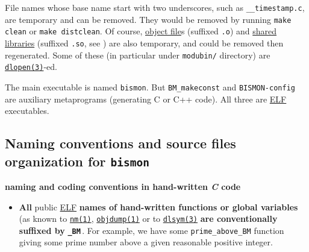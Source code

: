 \begin{appendices}
File names whose base name start with two underscores, such as
\texttt{\_\_timestamp.c}, are temporary and can be removed. They would
be removed by running \texttt{make clean} or \texttt{make
  distclean}.
 Of course,
\href{https://en.wikipedia.org/wiki/Object_file}{object file}s
(suffixed \texttt{.o}) and
\href{https://en.wikipedia.org/wiki/Library_(computing)#Shared_libraries}{shared
  libraries} (suffixed \texttt{.so}, see
\cite{Drepper:2011:sharedlib}) are also temporary, and could be
removed then regenerated. Some of these (in particular under
\texttt{modubin/} directory) are
\href{https://man7.org/linux/man-pages/man3/dlopen.3.html}{\texttt{dlopen(3)}}-ed.

The main executable is named \texttt{bismon}. But
\texttt{BM\_makeconst} and \texttt{BISMON-config} are auxiliary
metaprograms (generating C or C++ code). All three are
\href{https://en.wikipedia.org/wiki/Executable_and_Linkable_Format}{ELF}
executables.

\medskip

\subsection{Naming conventions and source files organization for \texttt{bismon}}

\medskip

{\large \textbf{naming and coding conventions in hand-written \emph{C} code}}

\begin{itemize}

  \item \textbf{All} public
    \href{https://en.wikipedia.org/wiki/Executable_and_Linkable_Format}{ELF}
    \textbf{names of hand-written functions or global variables} (as
    known to
    \href{https://man7.org/linux/man-pages/man1/nm.1.html}{\texttt{nm(1)}},
    \href{https://man7.org/linux/man-pages/man1/objdump.1.html}{\texttt{objdump(1)}}
    or to
    \href{https://man7.org/linux/man-pages/man3/dlsym.3.html}{\texttt{dlsym(3)}}
    \textbf{are conventionally suffixed by}
           {\texttt{\textbf{\_BM}}}\,. For example, we have some
           \texttt{prime\_above\_BM} function giving some prime number
           above a given reasonable positive integer.


\end{itemize}
\end{appendices}
